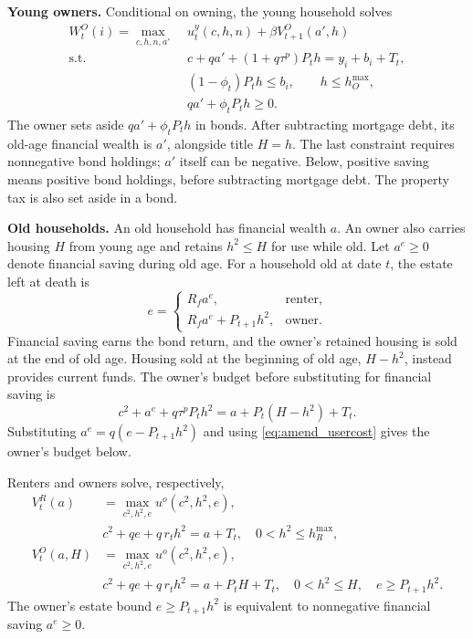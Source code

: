 \textbf{Young owners.}
Conditional on owning, the young household solves
\begin{align}
 W_t^O(i)=\max_{c,h,n,a'}\;&u_t^y(c,h,n)+\beta V_{t+1}^O(a',h) \nonumber\\
 \text{s.t.}\quad&
 c+qa'+(1+q\tau^p)P_th=y_i+b_i+T_t,\nonumber\\[-2pt]
 &(1-\phi_t)P_th\leq b_i,\qquad h\leq h_O^{\max},\nonumber\\[-2pt]
 &qa'+\phi_tP_th\geq0.
 \label{eq:amend_young_owner}
\end{align}
The owner sets aside $qa'+\phi_tP_th$ in bonds. After subtracting mortgage
debt, its old-age financial wealth is $a'$, alongside title
$H=h$. The last constraint requires nonnegative bond holdings; $a'$ itself
can be negative. Below, positive saving means positive bond holdings,
before subtracting mortgage debt. The property tax is also set aside in a bond.

\textbf{Old households.}
An old household has financial wealth $a$. An owner also carries housing $H$
from young age and retains $h^2\leq H$ for use while old. Let $a^e\geq0$
denote financial saving during old age. For a household old at date $t$,
the estate left at death is
\begin{equation}
 e=\begin{cases}
 R_f a^e, & \text{renter},\\
 R_f a^e+P_{t+1}h^2, & \text{owner}.
 \end{cases}
 \label{eq:amend_estate_components}
\end{equation}
Financial saving earns the bond return, and the owner's retained housing
is sold at the end of old age. Housing sold at the beginning of old age,
$H-h^2$, instead provides current funds. The owner's budget before
substituting for financial saving is
\begin{equation}
 c^2+a^e+q\tau^pP_t h^2=a+P_t(H-h^2)+T_t.
 \label{eq:amend_old_cash_budget}
\end{equation}
Substituting $a^e=q(e-P_{t+1}h^2)$ and using
\eqref{eq:amend_usercost} gives the owner's budget below.
\par{}
Renters and owners solve, respectively,
\begin{align}
 V_t^R(a)&=\max_{c^2,h^2,e}u^o(c^2,h^2,e),\nonumber\\
 &c^2+qe+q\,r_th^2=a+T_t,\quad 0<h^2\leq h_R^{\max},
 \label{eq:amend_old_renter}\\
 V_t^O(a,H)&=\max_{c^2,h^2,e}u^o(c^2,h^2,e),\nonumber\\
 &c^2+qe+q\,r_th^2=a+P_tH+T_t,\quad
 0<h^2\leq H,\quad e\geq P_{t+1}h^2.
 \label{eq:amend_old_budget}
\end{align}
The owner's estate bound $e\geq P_{t+1}h^2$ is equivalent to
nonnegative financial saving $a^e\geq0$.

